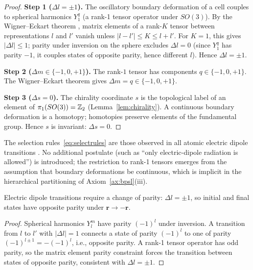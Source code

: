 \begin{proof}
\textbf{Step 1 ($\Delta l=\pm 1$).} The oscillatory boundary deformation of a cell couples to spherical harmonics $Y_{1}^{q}$ (a rank-1 tensor operator under $SO(3)$). By the Wigner--Eckart theorem \citep{wigner1959,sakurai2017}, matrix elements of a rank-$K$ tensor between representations $l$ and $l'$ vanish unless $|l-l'|\le K\le l+l'$. For $K=1$, this gives $|\Delta l|\le 1$; parity under inversion on the sphere excludes $\Delta l=0$ (since $Y_{1}^{q}$ has parity $-1$, it couples states of opposite parity, hence different $l$). Hence $\Delta l=\pm 1$.

\textbf{Step 2 ($\Delta m\in\{-1,0,+1\}$).} The rank-$1$ tensor has components $q\in\{-1,0,+1\}$. The Wigner--Eckart theorem gives $\Delta m=q\in\{-1,0,+1\}$.

\textbf{Step 3 ($\Delta s=0$).} The chirality coordinate $s$ is the topological label of an element of $\pi_{1}(SO(3))=\mathbb{Z}_{2}$ (Lemma~\ref{lem:chirality}). A continuous boundary deformation is a homotopy; homotopies preserve elements of the fundamental group. Hence $s$ is invariant: $\Delta s=0$.
\end{proof}

\begin{remark}
The selection rules~\eqref{eq:selectrules} are those observed in all atomic electric dipole transitions \citep{herzberg1944,nistasd}. No additional postulate (such as ``only electric-dipole radiation is allowed'') is introduced; the restriction to rank-1 tensors emerges from the assumption that boundary deformations be continuous, which is implicit in the hierarchical partitioning of Axiom~\ref{ax:bpsl}(iii).
\end{remark}

\begin{corollary}
\label{cor:parity}
Electric dipole transitions require a change of parity: $\Delta l=\pm 1$, so initial and final states have opposite parity under $\mathbf{r}\to-\mathbf{r}$.
\end{corollary}

\begin{proof}
Spherical harmonics $Y_{l}^{m}$ have parity $(-1)^{l}$ under inversion. A transition from $l$ to $l'$ with $|\Delta l|=1$ connects a state of parity $(-1)^{l}$ to one of parity $(-1)^{l\pm 1}=-(-1)^{l}$, i.e., opposite parity. A rank-1 tensor operator has odd parity, so the matrix element parity constraint forces the transition between states of opposite parity, consistent with $\Delta l=\pm 1$.
\end{proof}

